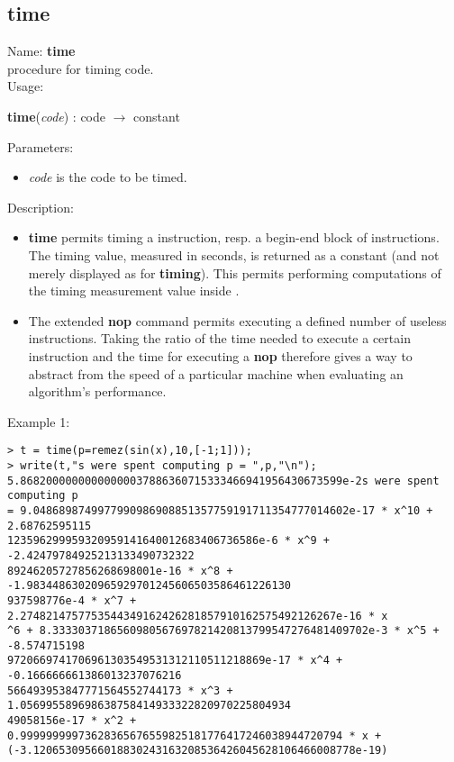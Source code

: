 \subsection{time}
\label{labtime}
\noindent Name: \textbf{time}\\
\phantom{aaa}procedure for timing \sollya code.\\[0.2cm]
\noindent Usage: 
\begin{center}
\textbf{time}(\emph{code}) : \textsf{code} $\rightarrow$ \textsf{constant}\\
\end{center}
Parameters: 
\begin{itemize}
\item \emph{code} is the code to be timed.
\end{itemize}
\noindent Description: \begin{itemize}

\item \textbf{time} permits timing a \sollya instruction, resp. a begin-end block
   of \sollya instructions. The timing value, measured in seconds, is returned
   as a \sollya constant (and not merely displayed as for \textbf{timing}). This 
   permits performing computations of the timing measurement value inside \sollya.

\item The extended \textbf{nop} command permits executing a defined number of
   useless instructions. Taking the ratio of the time needed to execute a
   certain \sollya instruction and the time for executing a \textbf{nop}
   therefore gives a way to abstract from the speed of a particular 
   machine when evaluating an algorithm's performance.
\end{itemize}
\noindent Example 1: 
\begin{center}\begin{minipage}{15cm}\begin{Verbatim}[frame=single]
> t = time(p=remez(sin(x),10,[-1;1]));
> write(t,"s were spent computing p = ",p,"\n");
5.86820000000000000037886360715333466941956430673599e-2s were spent computing p 
= 9.0486898749977990986908851357759191711354777014602e-17 * x^10 + 2.68762595115
123596299959320959141640012683406736586e-6 * x^9 + -2.42479784925213133490732322
89246205727856268698001e-16 * x^8 + -1.98344863020965929701245606503586461226130
937598776e-4 * x^7 + 2.2748214757753544349162426281857910162575492126267e-16 * x
^6 + 8.3333037186560980567697821420813799547276481409702e-3 * x^5 + -8.574715198
9720669741706961303549531312110511218869e-17 * x^4 + -0.166666661386013237076216
566493953847771564552744173 * x^3 + 1.056995589698638758414933322820970225804934
49058156e-17 * x^2 + 0.99999999973628365676559825181776417246038944720794 * x + 
(-3.12065309566018830243163208536426045628106466008778e-19)
\end{Verbatim}
\end{minipage}\end{center}
